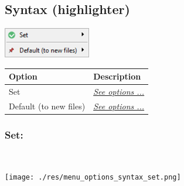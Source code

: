 \hypertarget{menu_options_syntax}{}
\subsection{Syntax (highlighter)}

\includegraphics[scale=0.50]{./res/menu_options_syntax.png}\\

\begin{scriptsize}
  \begin{tabularx}{\textwidth}{>{\hsize=0.3\hsize}X>{\hsize=0.7\hsize}X}\\
    \hline
    \textbf{Option} & \textbf{Description} \\
    \hline
    Set & \textit{\href{\#menu\_options\_syntax\_set}{See options ...}} \\
    \hdashline[1pt/1pt]
    Default (to new files) & \textit{\href{\#menu\_options\_syntax\_default}{See options ...}} \\
    \hline
  \end{tabularx}
\end{scriptsize}


\newpage
\hypertarget{menu_options_syntax_set}{}
\subsubsection{Set:}\\

\texttt{[image: ./res/menu\_options\_syntax\_set.png]}\\


